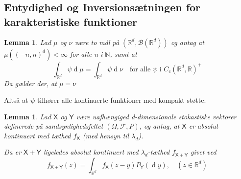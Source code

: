 \documentclass{article}
\newcommand{\N}{\mathbb{N}}
\newcommand{\R}{\mathbb{R}}
\newcommand{\1}{\mathbbm{1}}
\newcommand{\X}{\mathsf{X}}
\newcommand{\Y}{\mathsf{Y}}
\newcommand{\B}{\mathcal{B}}
\newcommand{\deriv}{\operatorname{d}}
\newcommand{\pfield}{(\Omega, \mathcal{F}, P)}
\newtheorem{lemma}[theorem]{Lemma}
\theoremstyle{boxed}
\begin{document}
\subsection{Entydighed og Inversionsætningen for karakteristiske funktioner}
\begin{theorem-box}
    \begin{lemma}
        Lad $\mu$ og $\nu$ være to mål på $(\R^d, \B(\R^d))$ og antag at $\mu((-n,n)^d)<\infty$ for alle n i $\N$, samt at
        $$\int_{\R^d}\psi \deriv \mu =\int_{\R^d}\psi \deriv \nu\quad \text{for alle }\psi \text{ i } C_c(\R^d,\R)^+$$
        Da gælder der, at $\mu=\nu$
    \end{lemma}
\end{theorem-box}
Altså at $\psi$ tilhører alle kontinuerte funktioner med kompakt støtte.
\begin{theorem-box}
    \begin{lemma}
        Lad $\X$ og $\Y$ være uafhængiged d-dimensionale stokastiske vektorer definerede på sandsynlighedsfeltet $\pfield$, og antag, at $\X$ er absolut kontinuert med tæthed $f_\X$ (med hensyn til $\lambda_d$).

        Da er $\X+\Y$ ligeledes absolut kontinuert med $\lambda_d$-tæthed $f_{\X+\Y}$ givet ved
        $$f_{\X+\Y}(z)=\int_{\R^d}f_\X(z-y)P_\Y(\deriv y), \quad (z\in\R^d)$$
    \end{lemma}
\end{theorem-box}
\end{document}
